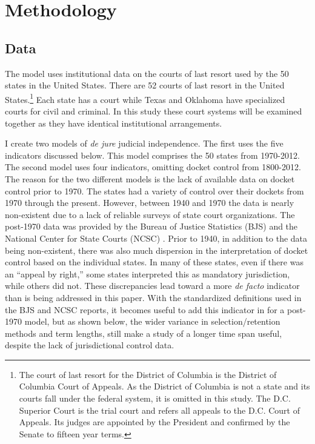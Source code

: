 \documentclass[12pt]{article}
\begin{document}
\section*{Methodology}
\subsection*{Data}
The model uses institutional data on the courts of last resort used by the 50 states in the United States.  There are 52 courts of last resort in the United States.\footnote{The court of last resort for the District of Columbia is the District of Columbia Court of Appeals.  As the District of Columbia is not a state and its courts fall under the federal system, it is omitted in this study.  The D.C. Superior Court is the trial court and refers all appeals to the D.C. Court of Appeals.  Its judges are appointed by the President and confirmed by the Senate to fifteen year terms.}  Each state has a court while Texas and Oklahoma have specialized courts for civil and criminal.  In this study these court systems will be examined together as they have identical institutional arrangements.  

I create two models of \textit{de jure} judicial independence.  The first uses the five indicators discussed below.  This model comprises the 50 states from 1970-2012.  The second model uses four indicators, omitting docket control from 1800-2012.  The reason for the two different models is the lack of available data on docket control prior to 1970.  The states had a variety of control over their dockets from 1970 through the present.  However, between 1940 and 1970 the data is nearly non-existent due to a lack of reliable surveys of state court organizations.  The post-1970 data was provided by the Bureau of Justice Statistics (BJS) and the National Center for State Courts (NCSC) \citep{BJS1993,BJS1998,BJS2004}.  Prior to 1940, in addition to the data being non-existent, there was also much dispersion in the interpretation of docket control based on the individual states.  In many of these states, even if there was an ``appeal by right,'' some states interpreted this as mandatory jurisdiction, while others did not.  These discrepancies lead toward a more \textit{de facto} indicator than is being addressed in this paper.  With the standardized definitions used in the BJS and NCSC reports, it becomes useful to add this indicator in for a post-1970 model, but as shown below, the wider variance in selection/retention methods and term lengths, still make a study of a longer time span useful, despite the lack of jurisdictional control data.  
\end{document}
